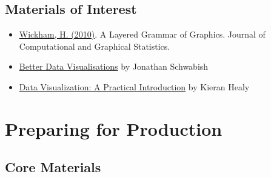 \documentclass[
  12pt,
]{book}
\providecommand{\tightlist}{%
  \setlength{\itemsep}{0pt}\setlength{\parskip}{0pt}}
\begin{document}
\hypertarget{materials-of-interest-2}{%
\subsection*{Materials of Interest}\label{materials-of-interest-2}}

\begin{itemize}
\item
  \href{https://library-search.imperial.ac.uk/discovery/fulldisplay?docid=cdi_informaworld_taylorfrancis_310_1198_jcgs_2009_07098\&context=PC\&vid=44IMP_INST:ICL_VU1\&lang=en\&search_scope=MyInst_and_CI\&adaptor=Primo\%20Central\&tab=Everything\&query=any,contains,layered\%20grammar\%20of\%20graphics\&offset=0}{Wickham, H. (2010)}. A Layered Grammar of Graphics. Journal of Computational and Graphical Statistics.
\item
  \href{https://library-search.imperial.ac.uk/discovery/fulldisplay?docid=alma991000664639501591\&context=L\&vid=44IMP_INST:ICL_VU1\&lang=en\&search_scope=MyInst_and_CI\&adaptor=Local\%20Search\%20Engine\&tab=Everything\&query=any,contains,better\%20data\%20visualisations\&offset=0}{Better Data Visualisations} by Jonathan Schwabish
\end{itemize}

\begin{itemize}
\tightlist
\item
  \href{https://library-search.imperial.ac.uk/discovery/fulldisplay?docid=alma991000211295101591\&context=L\&vid=44IMP_INST:ICL_VU1\&lang=en\&search_scope=MyInst_and_CI\&adaptor=Local\%20Search\%20Engine\&tab=Everything\&query=any,contains,Data\%20Visualization\%20\%E2\%80\%93\%20A\%20Practical\%20Introduction\&offset=0}{Data Visualization: A Practical Introduction} by Kieran Healy
\end{itemize}

\hypertarget{preparing-for-production}{%
\section{Preparing for Production}\label{preparing-for-production}}

\hypertarget{core-materials-3}{%
\subsection*{Core Materials}\label{core-materials-3}}
\end{document}
